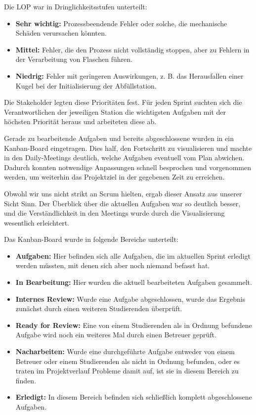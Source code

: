 Die LOP war in Dringlichkeitsstufen unterteilt:
\begin{itemize}
    \item \textbf{Sehr wichtig:} Prozessbeendende Fehler oder solche, die mechanische Schäden verursachen könnten.
    \item \textbf{Mittel:} Fehler, die den Prozess nicht vollständig stoppen, aber zu Fehlern in der Verarbeitung von Flaschen führen.
    \item \textbf{Niedrig:} Fehler mit geringeren Auswirkungen, z. B. das Herausfallen einer Kugel bei der Initialisierung der Abfüllstation.
\end{itemize}


Die Stakeholder legten diese Prioritäten fest. Für jeden Sprint suchten sich die Verantwortlichen der jeweiligen Station 
die wichtigsten Aufgaben mit der höchsten Priorität heraus und arbeiteten diese ab.  

Gerade zu bearbeitende Aufgaben und bereits abgeschlossene wurden in ein Kanban-Board eingetragen. Dies half, den Fortschritt 
zu visualisieren und machte in den Daily-Meetings deutlich, welche Aufgaben eventuell vom Plan abwichen. Dadurch konnten 
notwendige Anpassungen schnell besprochen und vorgenommen werden, um weiterhin das Projektziel in der gegebenen Zeit zu 
erreichen.  

Obwohl wir uns nicht strikt an Scrum hielten, ergab dieser Ansatz aus unserer Sicht Sinn. Der Überblick über die aktuellen 
Aufgaben war so deutlich besser, und die Verständlichkeit in den Meetings wurde durch die Visualisierung wesentlich 
erleichtert.

Das Kanban-Board wurde in folgende Bereiche unterteilt:
\begin{itemize}
    \item \textbf{Aufgaben:} Hier befinden sich alle Aufgaben, die im aktuellen Sprint erledigt werden müssten, mit denen 
    sich aber noch niemand befasst hat.
    \item \textbf{In Bearbeitung:} Hier wurden die aktuell bearbeiteten Aufgaben gesammelt.
    \item \textbf{Internes Review:} Wurde eine Aufgabe abgeschlossen, wurde das Ergebnis zunächst durch einen weiteren 
    Studierenden überprüft.
    \item \textbf{Ready for Review:} Eine von einem Studierenden als in Ordnung befundene Aufgabe wird noch ein weiteres 
    Mal durch einen Betreuer geprüft.
    \item \textbf{Nacharbeiten:} Wurde eine durchgeführte Aufgabe entweder von einem Betreuer oder einem Studierenden als 
    nicht in Ordnung befunden, oder es traten im Projektverlauf Probleme damit auf, ist sie in diesem Bereich zu finden.
    \item \textbf{Erledigt:} In diesem Bereich befinden sich schließlich komplett abgeschlossene Aufgaben.
\end{itemize}

